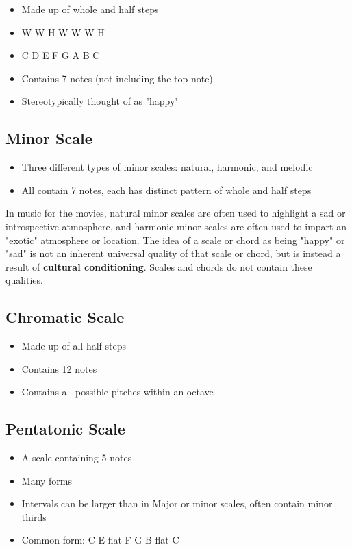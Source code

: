 \documentclass[12pt, a4paper]{report}
\begin{document}
  \begin{itemize}
    \item Made up of whole and half steps
    \item W-W-H-W-W-W-H
    \item C D E F G A B C
    \item Contains 7 notes (not including the top note)
    \item Stereotypically thought of as "happy"
  \end{itemize}

  \subsection{Minor Scale}

  \begin{itemize}
    \item Three different types of minor scales: natural, harmonic, and melodic
    \item All contain 7 notes, each has distinct pattern of whole and half steps
  \end{itemize}

  In music for the movies, natural minor scales are often used to highlight a sad or introspective atmosphere, and harmonic minor scales are often used to impart an "exotic" atmosphere or location. The idea of a scale or chord as being "happy" or "sad" is not an inherent universal quality of that scale or chord, but is instead a result of \textbf{cultural conditioning}. Scales and chords do not contain these qualities.

  \subsection{Chromatic Scale}

  \begin{itemize}
    \item Made up of all half-steps
    \item Contains 12 notes
    \item Contains all possible pitches within an octave
  \end{itemize}

  \subsection{Pentatonic Scale}

  \begin{itemize}
    \item A scale containing 5 notes
    \item Many forms
    \item Intervals can be larger than in Major or minor scales, often contain minor thirds
    \item Common form: C-E flat-F-G-B flat-C
  \end{itemize}
\end{document}
